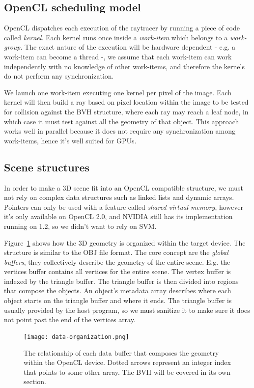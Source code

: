 \documentclass{vgtc}
\begin{document}
\subsection{OpenCL scheduling model}

OpenCL dispatches each execution of the raytracer by running a piece of
code called \emph{kernel}. Each kernel runs once inside a
\emph{work-item} which belongs to a \emph{work-group}. The exact
nature of the execution will be hardware dependent - e.g. a work-item
can become a thread -, we assume that each work-item can work
independently with no knowledge of other work-items, and therefore the
kernels do not perform any synchronization.

We launch one work-item executing one kernel per pixel of the
image. Each kernel will then build a ray based on pixel location
within the image to be tested for collision against the BVH structure,
where each ray may reach a leaf node, in which case it must test
against all the geometry of that object. This approach works well in
parallel because it does not require any synchronization among
work-items, hence it's well suited for GPUs.


\subsection{Scene structures}

In order to make a 3D scene fit into an OpenCL compatible structure,
we must not rely on complex data structures such as linked lists and
dynamic arrays. Pointers can only be used with a feature called
\emph{shared virtual memory}, however it's only available on OpenCL
2.0, and NVIDIA still has its implementation running on 1.2, so we
didn't want to rely on SVM.

Figure~\ref{fig:data-org} shows how the 3D geometry is organized
within the target device. The structure is similar to the OBJ file
format. The core concept are the \emph{global buffers}, they
collectively describe the geometry of the entire scene. E.g. the
vertices buffer contains all vertices for the entire scene. The vertex
buffer is indexed by the triangle buffer. The triangle buffer is then
divided into regions that compose the objects. An object's metadata
array describes where each object starts on the triangle buffer and
where it ends. The triangle buffer is usually provided by the host
program, so we must sanitize it to make sure it does not point past
the end of the vertices array.

\begin{figure}
\centering
\texttt{[image: data-organization.png]}
\caption{The relationship of each data buffer that composes the
  geometry within the OpenCL device. Dotted arrows represent an
  integer index that points to some other array. The BVH will be
  covered in its own section.}
\label{fig:data-org}
\end{figure}
\end{document}
